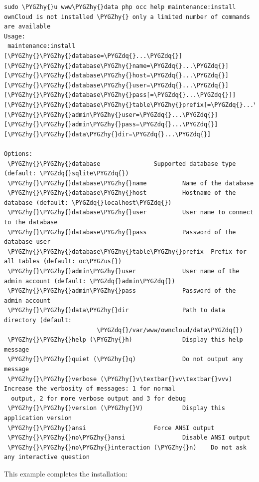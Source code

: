 \documentclass[letterpaper,10pt,english]{sphinxmanual}
\def\PYGZus{\char`\_}
\def\PYGZhy{\char`\-}
\def\PYGZdq{\char`\"}
\begin{document}
\begin{Verbatim}[commandchars=\\\{\}]
sudo \PYGZhy{}u www\PYGZhy{}data php occ help maintenance:install
ownCloud is not installed \PYGZhy{} only a limited number of commands are available
Usage:
 maintenance:install [\PYGZhy{}\PYGZhy{}database=\PYGZdq{}...\PYGZdq{}] [\PYGZhy{}\PYGZhy{}database\PYGZhy{}name=\PYGZdq{}...\PYGZdq{}]
[\PYGZhy{}\PYGZhy{}database\PYGZhy{}host=\PYGZdq{}...\PYGZdq{}] [\PYGZhy{}\PYGZhy{}database\PYGZhy{}user=\PYGZdq{}...\PYGZdq{}] [\PYGZhy{}\PYGZhy{}database\PYGZhy{}pass[=\PYGZdq{}...\PYGZdq{}]]
[\PYGZhy{}\PYGZhy{}database\PYGZhy{}table\PYGZhy{}prefix[=\PYGZdq{}...\PYGZdq{}]] [\PYGZhy{}\PYGZhy{}admin\PYGZhy{}user=\PYGZdq{}...\PYGZdq{}] [\PYGZhy{}\PYGZhy{}admin\PYGZhy{}pass=\PYGZdq{}...\PYGZdq{}]
[\PYGZhy{}\PYGZhy{}data\PYGZhy{}dir=\PYGZdq{}...\PYGZdq{}]

Options:
 \PYGZhy{}\PYGZhy{}database               Supported database type (default: \PYGZdq{}sqlite\PYGZdq{})
 \PYGZhy{}\PYGZhy{}database\PYGZhy{}name          Name of the database
 \PYGZhy{}\PYGZhy{}database\PYGZhy{}host          Hostname of the database (default: \PYGZdq{}localhost\PYGZdq{})
 \PYGZhy{}\PYGZhy{}database\PYGZhy{}user          User name to connect to the database
 \PYGZhy{}\PYGZhy{}database\PYGZhy{}pass          Password of the database user
 \PYGZhy{}\PYGZhy{}database\PYGZhy{}table\PYGZhy{}prefix  Prefix for all tables (default: oc\PYGZus{})
 \PYGZhy{}\PYGZhy{}admin\PYGZhy{}user             User name of the admin account (default: \PYGZdq{}admin\PYGZdq{})
 \PYGZhy{}\PYGZhy{}admin\PYGZhy{}pass             Password of the admin account
 \PYGZhy{}\PYGZhy{}data\PYGZhy{}dir               Path to data directory (default:
                          \PYGZdq{}/var/www/owncloud/data\PYGZdq{})
 \PYGZhy{}\PYGZhy{}help (\PYGZhy{}h)              Display this help message
 \PYGZhy{}\PYGZhy{}quiet (\PYGZhy{}q)             Do not output any message
 \PYGZhy{}\PYGZhy{}verbose (\PYGZhy{}v\textbar{}vv\textbar{}vvv)    Increase the verbosity of messages: 1 for normal
  output, 2 for more verbose output and 3 for debug
 \PYGZhy{}\PYGZhy{}version (\PYGZhy{}V)           Display this application version
 \PYGZhy{}\PYGZhy{}ansi                   Force ANSI output
 \PYGZhy{}\PYGZhy{}no\PYGZhy{}ansi                Disable ANSI output
 \PYGZhy{}\PYGZhy{}no\PYGZhy{}interaction (\PYGZhy{}n)    Do not ask any interactive question
\end{Verbatim}

This example completes the installation:
\end{document}
